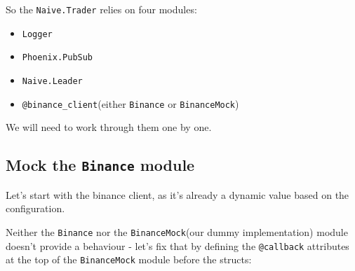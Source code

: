 \documentclass[
  oneside]{book}
\providecommand{\tightlist}{%
  \setlength{\itemsep}{0pt}\setlength{\parskip}{0pt}}
\begin{document}
So the \texttt{Naive.Trader} relies on four modules:

\begin{itemize}
\tightlist
\item
  \texttt{Logger}
\item
  \texttt{Phoenix.PubSub}
\item
  \texttt{Naive.Leader}
\item
  \texttt{@binance\_client}(either \texttt{Binance} or \texttt{BinanceMock})
\end{itemize}

We will need to work through them one by one.

\subsection{\texorpdfstring{Mock the \texttt{Binance} module}{Mock the Binance module}}\label{mock-the-binance-module}

Let's start with the binance client, as it's already a dynamic value based on the configuration.

Neither the \texttt{Binance} nor the \texttt{BinanceMock}(our dummy implementation) module doesn't provide a behaviour - let's fix that by defining the \texttt{@callback} attributes at the top of the \texttt{BinanceMock} module before the structs:
\end{document}
